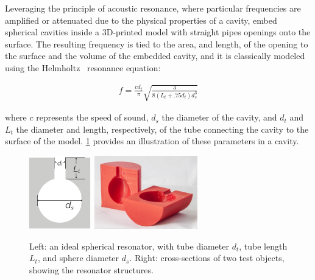         Leveraging the principle of acoustic resonance, where particular
        frequencies are amplified or attenuated due to the physical properties
        of a cavity, \bh embed spherical cavities inside a 3D-printed model
        with straight pipes openings onto the surface. The resulting frequency
        is tied to the area, and length, of the opening to the surface and the
        volume of the embedded cavity, and it is classically modeled using the
        Helmholtz~\cite{Helmholtz:1885vp} resonance equation:

        \begin{align}\label{eq:hhz}
          f = \frac{cd_t}{\pi}\sqrt{\frac{3}{8(L_t+.75 d_t)d_s^3}}
        \end{align}

        where $c$ represents the speed of sound, $d_s$ the diameter of the
        cavity, and $d_t$ and $L_t$ the diameter and length, respectively, of
        the tube connecting the cavity to the surface of the model.
        \cref{fig:resonator} provides an illustration of these parameters in a
        \bh cavity.

        \begin{figure}[H]
          \centering
            \includegraphics[height=1.25in]{figures/helmholtz_illustration}
            \quad
            \includegraphics[height=1.25in]{figures/cavities2}
            \caption{Left: an ideal spherical \hhz resonator, with tube
              diameter $d_t$, tube length $L_t$, and sphere diameter $d_s$.
              Right: cross-sections of two \bh test objects, showing the
              resonator structures.}
            \label{fig:resonator}
        \end{figure}

